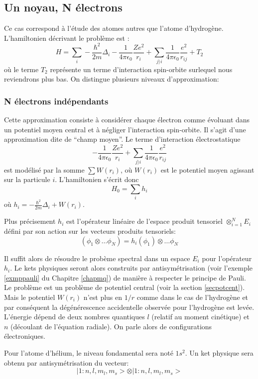 \documentclass[12pt]{book}
\begin{document}
\subsection{Un noyau, N \'electrons}
Ce cas correspond \`a l'\'etude des atomes autres que l'atome
d'hydrog\`ene.
L'hamiltonien d\'ecrivant le probl\`eme est :
\begin{equation}
H=\sum_i-\frac{\hbar^2}{2m}\Delta_i-
\frac{1}{4\pi\epsilon_0}\frac{Ze^2}{r_i}+ \sum_{j\rangle
i}\frac{1}{4\pi\epsilon_0}\frac{e^2}{r_{ij}}+T_2 
\end{equation}
o\`u le terme $T_2$ repr\'esente un terme d'interaction spin-orbite
surlequel nous reviendrons plus bas.
On distingue plusieurs niveaux d'approximation:
\subsubsection{N \'electrons ind\'ependants}
Cette approximation consiste \`a consid\'erer chaque \'electron comme
\'evoluant dans un potentiel moyen central et \`a n\'egliger
l'interaction spin-orbite. Il s'agit d'une
approximation dite de ``champ moyen''. Le terme d'interaction
\'electrostatique
\begin{equation}
-\frac{1}{4\pi\epsilon_0}\frac{Ze^2}{r_i}+\sum_{j\rangle
i}\frac{1}{4\pi\epsilon_0}\frac{e^2}{r_{ij}}
\end{equation}
est mod\'elis\'e par la
somme $\sum W(r_i)$, o\`u $W(r_i)$ est le potentiel moyen agissant sur
la particule $i$.
L'hamiltonien s'\'ecrit donc
\begin{equation}
H_0=\sum_ih_i
\end{equation}
o\`u $h_i=-\frac{\hbar^2}{2m}\Delta_i+W(r_i)$.
\begin{rem}
Plus pr\'ecisement $h_i$ est l'op\'erateur lin\'eaire de l'espace produit
tensoriel $\otimes_{i=1}^N E_i$ d\'efini  par son action sur les
vecteurs produits tensoriels:
\begin{equation}
[1_1\otimes\dots\otimes 1_{i-1}\otimes h_i \otimes 1_{i+1}\dots\otimes
1_{N}] 
(\phi_1\otimes\dots\phi_N)
=h_i(\phi_1)\otimes\dots\phi_N 
\end{equation}
\end{rem}
Il suffit alors de r\'esoudre le prob\`eme spectral dans un espace
$E_i$ pour l'op\'erateur $h_i$. Le kets physiques seront alors
construits par antisym\'etrisation (voir l'exemple \ref{exmppauli} du
Chapitre \ref{chapmq}) de mani\`ere \`a respecter le principe de
Pauli.
Le probl\`eme est un probl\`eme de potentiel central (voir la section
\ref{secpotcent}). Mais le potentiel $W(r_i)$ n'est plus en $1/r$
comme dans le cas de l'hydrog\`ene et par cons\'equent la
d\'eg\'en\'erescence accidentelle observ\'ee pour l'hydrog\`ene est
lev\'ee. L'\'energie d\'epend de deux nombres quantiques $l$ (relatif au
moment cin\'etique) et $n$ (d\'ecoulant de l'\'equation radiale).
On parle alors de configurations \'electroniques.
\begin{exmp}
Pour l'atome d'h\'elium, le niveau fondamental sera not\'e $1s^2$. Un
ket physique sera obtenu par antisym\'etrisation du vecteur:
\begin{equation}
|1:n,l,m_l,m_s>\otimes|1:n,l,m_l,m_s>
\end{equation}
\end{exmp}
\end{document}
